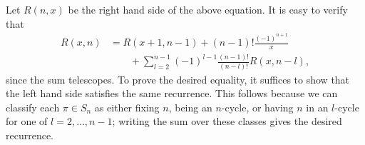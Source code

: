 \documentclass[amssymb,twocolumn,pra,10pt,aps]{revtex4-1}
\begin{document}
\begin{itemize}
Let $R(n,x)$ be the right hand side of the above equation. It is
easy to verify that
\begin{align*}
R(x,n) &= R(x+1,n-1) + (n-1)! \frac{(-1)^{n+1}}{x} \\
&\qquad + \sum_{l=2}^{n-1} (-1)^{l-1}  \frac{(n-1)!}{(n-l)!} R(x,n-l),
\end{align*}
since the sum telescopes. To prove the desired equality,
it suffices to show that the left hand side satisfies the same
recurrence. This follows because we can classify each $\pi \in S_n$
as either fixing $n$, being an $n$-cycle, or having $n$ in an
$l$-cycle for one of $l=2,\dots,n-1$; writing the sum
over these classes gives the desired recurrence.

\end{itemize}
\end{document}

